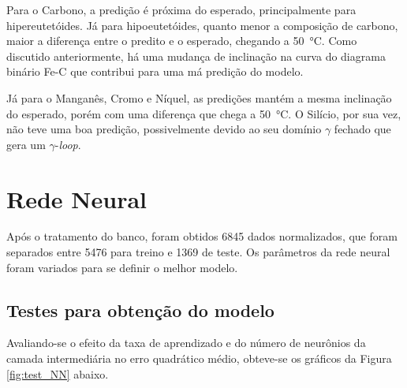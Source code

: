\documentclass[brazil,tf,epusp]{usp}  %
\begin{document}
Para o Carbono, a predição é próxima do esperado, principalmente para hipereutetóides. Já para hipoeutetóides, quanto menor a composição de carbono, maior a diferença entre o predito e o esperado, chegando a \SI{50}{\celsius}. Como discutido anteriormente, há uma mudança de inclinação na curva do diagrama binário Fe-C que contribui para uma má predição do modelo.

Já para o Manganês, Cromo e Níquel, as predições mantém a mesma inclinação do esperado, porém com uma diferença que chega a \SI{50}{\celsius}. O Silício, por sua vez, não teve uma boa predição, possivelmente devido ao seu domínio $\gamma$ fechado que gera um $\gamma$-\textit{loop}.

\section{Rede Neural}
Após o tratamento do banco, foram obtidos 6845 dados normalizados, que foram separados entre 5476 para treino e 1369 de teste. Os parâmetros da rede neural foram variados para se definir o melhor modelo.

\subsection{Testes para obtenção do modelo}

Avaliando-se o efeito da taxa de aprendizado e do número de neurônios da camada intermediária no erro quadrático médio, obteve-se os
gráficos da Figura \ref{fig:test_NN} abaixo.
\end{document}
